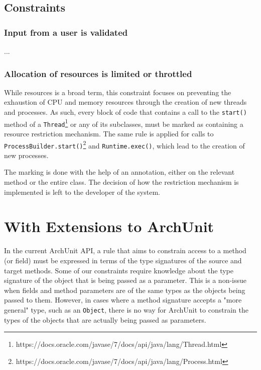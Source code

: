
\subsection{Constraints}


\subsubsection*{Input from a user is validated}
...

\subsubsection*{Allocation of resources is limited or throttled}
While resources is a broad term, this constraint focuses on preventing the exhaustion of CPU and memory resources through the creation of new threads and processes. As such, every block of code that contains a call to the \texttt{start()} method of a \texttt{Thread}\footnote{https://docs.oracle.com/javase/7/docs/api/java/lang/Thread.html} or any of its subclasses, must be marked as containing a resource restriction mechanism. The same rule is applied for calls to \texttt{ProcessBuilder.start()}\footnote{https://docs.oracle.com/javase/7/docs/api/java/lang/Process.html} and \texttt{Runtime.exec()}\footnotemark[3], which lead to the creation of new processes.

The marking is done with the help of an annotation, either on the relevant method or the entire class. The decision of how the restriction mechanism is implemented is left to the developer of the system.

\section{With Extensions to ArchUnit}

In the current ArchUnit API, a rule that aims to constrain access to a method (or field) must be expressed in terms of the type signatures of the source and target methods. Some of our constraints require knowledge about the type signature of the object that is being passed as a parameter. This is a non-issue when fields and method parameters are of the same types as the objects being passed to them. However, in cases where a method signature accepts a "more general" type, such as an \texttt{Object}, there is no way for ArchUnit to constrain the types of the objects that are actually being passed as parameters.

